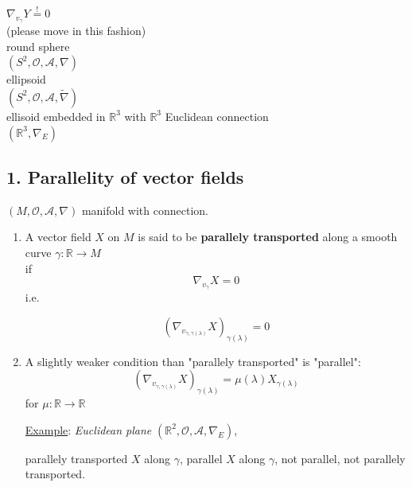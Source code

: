 $\nabla_{v_{\gamma}} Y \overset{!}{=} 0$ \\
(please move in this fashion) \\

round sphere \\
$(S^2, \mathcal{O}, \mathcal{A}, \nabla)$ \\

ellipsoid \\
$(S^2, \mathcal{O}, \mathcal{A}, \widetilde{\nabla})$ \\

ellisoid embedded in $\mathbb{R}^3$ with $\mathbb{R}^3$ Euclidean connection \\
$(\mathbb{R}^3, \nabla_E)$

	
	\subsection*{1. Parallelity of vector fields}
	
	$(M,\mathcal{O}, \mathcal{A}, \nabla)$ manifold with connection.

\begin{definition} 
\begin{enumerate}
	\item[(1)]	A vector field $X$ on $M$ is said to be \textbf{parallely transported} along a smooth curve $\gamma: \mathbb{R} \to M$ \\
	if 
	\[
	\boxed{ \nabla_{v_{\gamma}} X = 0 }
	\]
i.e.

\[
\left( \nabla_{v_{\gamma, \gamma(\lambda) } } X \right)_{\gamma(\lambda)} = 0 
\]	

	\item[(2)] A slightly weaker condition than "parallely transported" is "parallel":
			\[
( \nabla_{v_{\gamma, \gamma(\lambda)} } X)_{\gamma(\lambda)} = \mu(\lambda) X_{\gamma(\lambda)}
\]
for $\mu : \mathbb{R} \to \mathbb{R}$

\underline{Example}: \emph{Euclidean plane} $(\mathbb{R}^2, \mathcal{O}, \mathcal{A}, \nabla_E)$,

parallely transported $X$ along $\gamma$, parallel $X$ along $\gamma$, not parallel, not parallely transported.
\end{enumerate}
\end{definition}




			





